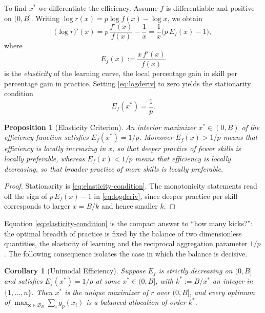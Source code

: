 \documentclass[11pt]{article}
\newtheorem{proposition}[theorem]{Proposition}
\newtheorem{corollary}[theorem]{Corollary}
\theoremstyle{definition}
\theoremstyle{remark}
\newcommand{\vx}{\mathbf{x}}
\newcommand{\simplex}{\mathcal{B}}
\newcommand{\eff}{r}
\newcommand{\elas}{E}
\begin{document}
To find \(x^*\) we differentiate the efficiency. Assume \(f\) is
differentiable and positive on \((0,B]\). Writing \(\log\eff(x)=p\log
f(x)-\log x\), we obtain
\begin{equation}
    \bigl(\log\eff\bigr)'(x)
    =
    p\,\frac{f'(x)}{f(x)}-\frac1x
    =
    \frac1x\bigl(p\,\elas_f(x)-1\bigr),
    \label{eq:logderiv}
\end{equation}
where
\begin{equation}
    \elas_f(x)
    :=
    \frac{x\,f'(x)}{f(x)}
    \label{eq:elasticity}
\end{equation}
is the \emph{elasticity} of the learning curve, the local percentage gain
in skill per percentage gain in practice. Setting \eqref{eq:logderiv} to
zero yields the stationarity condition
\begin{equation}
    \elas_f(x^*)=\frac1p.
    \label{eq:elasticity-condition}
\end{equation}

\begin{proposition}[Elasticity Criterion]
\label{prop:elasticity}
An interior maximizer \(x^*\in(0,B)\) of the efficiency function satisfies
\(\elas_f(x^*)=1/p\). Moreover \(\elas_f(x)>1/p\) means that efficiency is
locally increasing in \(x\), so that deeper practice of fewer skills is
locally preferable, whereas \(\elas_f(x)<1/p\) means that efficiency is
locally decreasing, so that broader practice of more skills is locally
preferable.
\end{proposition}

\begin{proof}
Stationarity is \eqref{eq:elasticity-condition}. The monotonicity
statements read off the sign of \(p\,\elas_f(x)-1\) in
\eqref{eq:logderiv}, since deeper practice per skill corresponds to larger
\(x=B/k\) and hence smaller \(k\).
\end{proof}

Equation \eqref{eq:elasticity-condition} is the compact answer to
``how many kicks?'': the optimal breadth of practice is fixed by the
balance of two dimensionless quantities, the elasticity of learning
and the reciprocal aggregation parameter \(1/p\). The following
consequence isolates the case in which the balance is decisive.

\begin{corollary}[Unimodal Efficiency]
\label{cor:elasticity-structural}
Suppose \(\elas_f\) is strictly decreasing on \((0,B]\) and satisfies
\(\elas_f(x^*)=1/p\) at some \(x^*\in(0,B]\), with \(k^*:=B/x^*\) an integer
in \(\{1,\ldots,n\}\). Then \(x^*\) is the unique maximizer of \(\eff\) over
\((0,B]\), and every optimum of \(\max_{\vx\in\simplex_B}\sum_i g_p(x_i)\) is
a balanced allocation of order \(k^*\).
\end{corollary}
\end{document}
